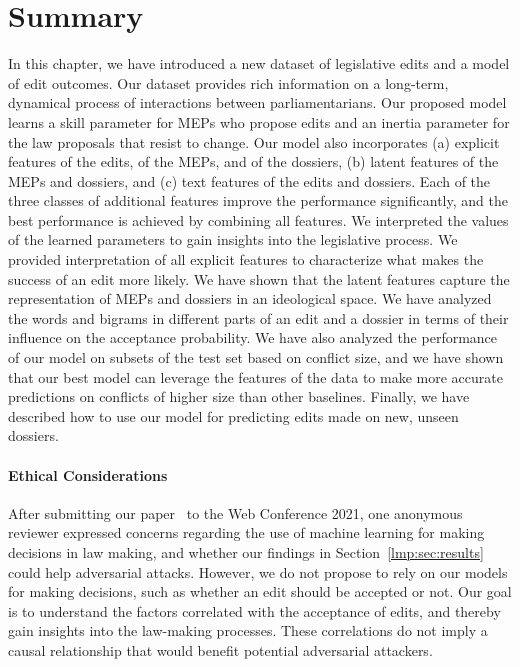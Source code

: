 \section{Summary}
\label{lmp:sec:conclusion}

In this chapter, we have introduced a new dataset of legislative edits and a model of edit outcomes.
Our dataset provides rich information on a long-term, dynamical process of interactions between parliamentarians.
Our proposed model learns a skill parameter for MEPs who propose edits and an inertia parameter for the law proposals that resist to change.
Our model also incorporates (a) explicit features of the edits, of the MEPs, and of the dossiers, (b) latent features of the MEPs and dossiers, and (c) text features of the edits and dossiers.
Each of the three classes of additional features improve the performance significantly, and the best performance is achieved by combining all features.
We interpreted the values of the learned parameters to gain insights into the legislative process.
We provided interpretation of all explicit features to characterize what makes the success of an edit more likely.
We have shown that the latent features capture the representation of MEPs and dossiers in an ideological space.
We have analyzed the words and bigrams in different parts of an edit and a dossier in terms of their influence on the acceptance probability.
We have also analyzed the performance of our model on subsets of the test set based on conflict size, and we have shown that our best model can leverage the features of the data to make more accurate predictions on conflicts of higher size than other baselines.
Finally, we have described how to use our model for predicting edits made on new, unseen dossiers.

\paragraph{Ethical Considerations}
After submitting our paper~\citep{kristof2021war} to the Web Conference 2021, one anonymous reviewer expressed concerns regarding the use of machine learning for making decisions in law making, and whether our findings in Section~\ref{lmp:sec:results} could help adversarial attacks.
However, we do not propose to rely on our models for making decisions, such as whether an edit should be accepted or not.
Our goal is to understand the factors correlated with the acceptance of edits, and thereby gain insights into the law-making processes.
These correlations do not imply a causal relationship that would benefit potential adversarial attackers.
